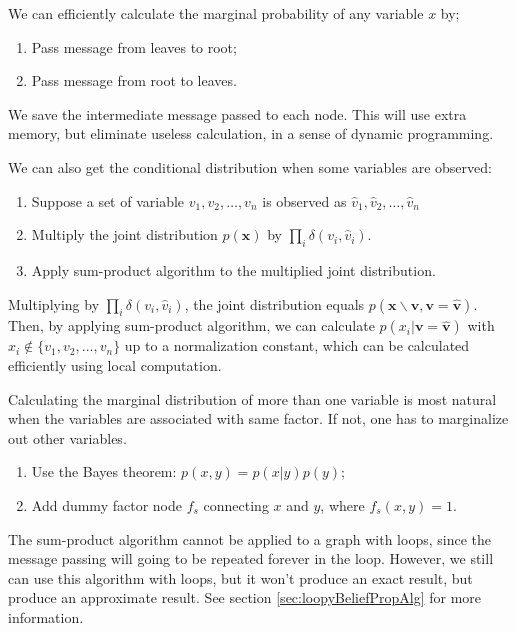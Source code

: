 \documentclass{article}
\begin{document}
        We can efficiently calculate the marginal probability of any variable $x$
        by;
        \begin{enumerate}
            \item Pass message from leaves to root;
            \item Pass message from root to leaves.
        \end{enumerate}
        We save the intermediate message passed to each node. This will use extra memory, but
        eliminate useless calculation, in a sense of dynamic programming.
        
        We can also get the conditional distribution when some variables are observed:
        \begin{enumerate}
            \item Suppose a set of variable ${v_1, v_2, \dots, v_n}$ is observed as ${\hat{v}_1, \hat{v}_2, \dots, \hat{v}_n}$ 
            \item Multiply the joint distribution $p(\textbf{x})$ by $\prod_{i} \delta(v_i, \hat{v}_i)$.
            \item Apply sum-product algorithm to the multiplied joint distribution.
        \end{enumerate}
        Multiplying by $\prod_{i} \delta(v_i, \hat{v}_i)$, the joint distribution equals
        $p(\textbf{x} \backslash \textbf{v}, \textbf{v} = \hat{\textbf{v}})$.
        Then, by applying sum-product algorithm, we can calculate $p(x_i|\textbf{v}=\hat{\textbf{v}})$ with $x_i \notin \{v_1, v_2, ..., v_n\}$ up to a normalization constant,
        which can be calculated efficiently using local computation.
        
        Calculating the marginal distribution of more than one variable is most natural when the variables
        are associated with same factor. If not, one has to marginalize out other variables.
        \begin{enumerate}
            \item Use the Bayes theorem: $p(x, y)=p(x|y)p(y)$;
            \item Add dummy factor node $f_s$ connecting $x$ and $y$, where $f_s(x,y)=1$.
        \end{enumerate}

        The sum-product algorithm cannot be applied to a graph with loops, since the message passing will
        going to be repeated forever in the loop. However, we still can use this algorithm with loops, but it won't
        produce an exact result, but produce an approximate result.
        See section \ref{sec:loopyBeliefPropAlg} for more information.
\end{document}
